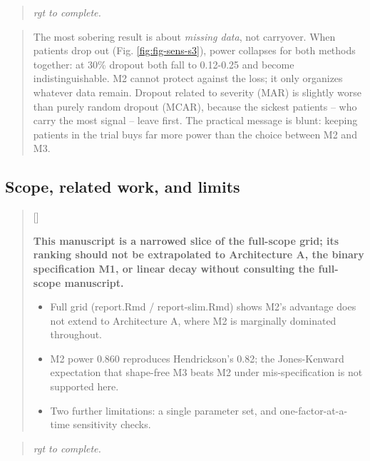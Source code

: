 \documentclass[
  11pt,
]{article}
\newcounter{pgraph}
\newenvironment{bullets}{%
  \stepcounter{pgraph}%
  \begin{quote}\small\sffamily\color[gray]{0.30}%
  {\normalfont\scriptsize\color[gray]{0.58}[\thepgraph]\enspace}}{%
  \end{quote}}
\newenvironment{rgt}{%
  \begin{quote}\small\itshape\color[RGB]{20,60,160}}{%
  \end{quote}}
\newenvironment{orig}{%
  \begin{quote}\normalsize\color[gray]{0.55}}{%
  \end{quote}}
\begin{document}
\begin{rgt}
rgt to complete.

\end{rgt}

\begin{orig}
The most sobering result is about \emph{missing data}, not carryover.
When patients drop out (Fig. \ref{fig:fig-sens-s3}), power collapses
for both methods together: at 30\% dropout both fall to 0.12-0.25 and
become indistinguishable. M2 cannot protect against the loss; it only
organizes whatever data remain. Dropout related to severity (MAR) is
slightly worse than purely random dropout (MCAR), because the
sickest patients -- who carry the most signal -- leave first. The
practical message is blunt: keeping patients in the trial buys far
more power than the choice between M2 and M3.

\end{orig}

\subsection{Scope, related work, and limits}\label{scope-related-work-and-limits}

\begin{bullets}

\textbf{This manuscript is a narrowed slice of the full-scope grid;
its ranking should not be extrapolated to Architecture A, the binary
specification M1, or linear decay without consulting the full-scope
manuscript.}

\begin{itemize}\setlength{\itemsep}{2pt}\setlength{\parskip}{0pt}
\item Full grid (report.Rmd / report-slim.Rmd) shows M2's advantage
does not extend to Architecture A, where M2 is marginally dominated
throughout.
\item M2 power 0.860 reproduces Hendrickson's 0.82; the Jones-Kenward
expectation that shape-free M3 beats M2 under mis-specification is
not supported here.
\item Two further limitations: a single parameter set, and
one-factor-at-a-time sensitivity checks.
\end{itemize}

\end{bullets}

\begin{rgt}
rgt to complete.

\end{rgt}
\end{document}
